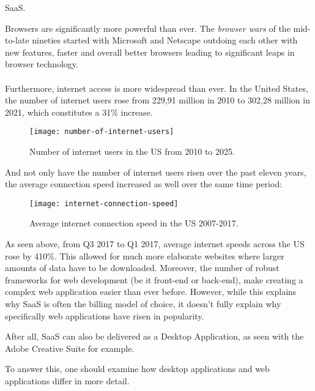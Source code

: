SaaS.\par
Browsers are significantly more powerful than ever. 
The \emph{browser wars} of the mid-to-late nineties started with Microsoft and Netscape outdoing each other with
new features, faster and overall better browsers leading to significant leaps in browser technology. \parencite{mozilla2021,jensen2017}\paragraph{}
Furthermore, internet access is more widespread than ever.
In the United States, the number of internet users rose from 229,91 million in 2010 to 302,28 million in 2021,
which constitutes a 31\% increase.\par
\begin{figure}[H]
    \centering
    \label{fig:num-of-internet-users}
    \caption{Number of internet users in the US from 2010 to 2025. \parencite{statista2021}}
    \texttt{[image: number-of-internet-users]}
\end{figure}
And not only have the number of internet users risen over the past eleven years, the average connection speed increased as well
over the same time period:
\begin{figure}[H]
    \centering
    \label{fig:internet-speed}
    \caption{Average internet connection speed in the US 2007-2017. \parencite{akamai2017}}
    \texttt{[image: internet-connection-speed]}
\end{figure}
As seen above, from Q3 2017 to Q1 2017, average internet speeds across the US rose by 410\%.
This allowed for much more elaborate websites where larger amounts of data have to be downloaded.
Moreover, the number of robust frameworks for web development (be it front-end or back-end), make creating a complex web application easier
than ever before.
However, while this explains why SaaS is often the billing model of choice, it doesn't fully explain why specifically web applications
have risen in popularity. \parencite{statista2021}\par
After all, SaaS can also be delivered as a Desktop Application, as seen with the Adobe Creative Suite for example. \parencite{adobe2021}\par
To answer this, one should examine how desktop applications and web applications differ in more detail.

